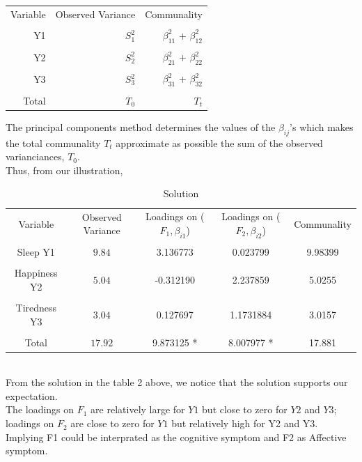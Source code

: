 \documentclass[12]{article}
\begin{document}
\begin{table}[ht]
	\centering

	\begin{tabular}{rrr}
		\hline
		
	Variable & Observed Variance & Communality  \\ 
		
		\\[0.1cm]
		Y1 & $S^2_1$ & $\beta^2_{11}$ + $\beta^2_{12}$ \\ 
		\\[0.2cm]
		Y2 & $S^2_2$ & $\beta^2_{21}$ + $\beta^2_{22}$ \\ 
		\\[0.2cm]
		Y3 & $S^2_3$ & $\beta^2_{31}$ + $\beta^2_{32}$ \\ 
		\\[0.2cm]
		Total& $T_0$ & $T_t$ \\
		\hline
	\end{tabular}
\end{table}
\newpage
\noindent The principal components method determines the values of the $\beta_{ij}$'s which makes the total communality $T_t$ approximate as possible the sum of the observed varianciances, $T_0$.\\
Thus, from our illustration, 
\begin{table}[ht]
	\centering
	
\begin{tabular}{>{\vspace{0.3cm}}ccccc}

		\hline
		
		Variable & Observed Variance &Loadings on ($F_1,\beta_{i1}$)& Loadings on ($F_2,\beta_{i2}$)& Communality  \\ 
		
		\\[0.1cm]
		Sleep Y1 & $9.84$ & 3.136773 &0.023799 &9.98399 \\ 
		\\[0.2cm]
	Happiness	Y2 & $5.04$ &-0.312190 &2.237859 & 5.0255 \\ 
		\\[0.2cm]
	Tiredness	Y3 & $3.04$ & 0.127697 &1.1731884 &3.0157 \\ 
		\\[0.2cm]
		Total& $17.92$ & 9.873125 * &8.007977 *& 17.881 \\
		\hline
	\end{tabular}
	\caption{Solution}
\end{table}\\
\noindent From the solution in the table 2 above, we notice that the solution supports our expectation.\\
\noindent The loadings on $F_1$ are relatively large for $Y1$  but close to zero for $Y2$ and $Y3$; loadings on $F_2$ are close to zero for $Y1$ but relatively high for Y2 and Y3. Implying F1 could be interprated as the cognitive symptom and F2 as Affective symptom.
\end{document}
